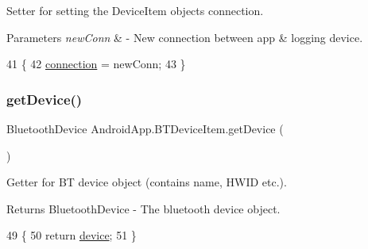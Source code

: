 Setter for setting the Device\+Item object\textquotesingle{}s connection. 


\begin{DoxyParams}{Parameters}
{\em new\+Conn} & -\/ New connection between app \& logging device. \\
\hline
\end{DoxyParams}

\begin{DoxyCode}
41                                                     \{
42         \hyperlink{class_android_app_1_1_b_t_device_item_a9a95ded58a8607664d020946e4e38364}{connection} = newConn;
43     \}
\end{DoxyCode}
\mbox{\label{class_android_app_1_1_b_t_device_item_a2e8577754ccc57fb1d9e94f818d41151}} 
\subsubsection{\texorpdfstring{get\+Device()}{getDevice()}}
{\footnotesize\ttfamily Bluetooth\+Device Android\+App.\+B\+T\+Device\+Item.\+get\+Device (\begin{DoxyParamCaption}{ }\end{DoxyParamCaption})\hspace{0.3cm}{\ttfamily [inline]}}



Getter for BT device object (contains name, H\+W\+ID etc.). 

\begin{DoxyReturn}{Returns}
Bluetooth\+Device -\/ The bluetooth device object. 
\end{DoxyReturn}

\begin{DoxyCode}
49                                        \{
50         \textcolor{keywordflow}{return} \hyperlink{class_android_app_1_1_b_t_device_item_a3f62f8de1d815f2e4f59030565ba29a1}{device};
51     \}
\end{DoxyCode}
\mbox{\label{class_android_app_1_1_b_t_device_item_a5a27acd244054ade34a6acd4a311e028}} 
